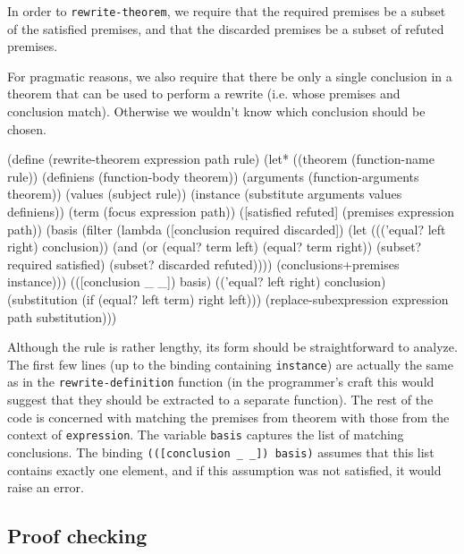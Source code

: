 In order to \texttt{rewrite-theorem}, we require that the required
premises be a subset of the satisfied premises, and that the discarded
premises be a subset of refuted premises.

For pragmatic reasons, we also require that there be only a single
conclusion in a theorem that can be used to perform a rewrite (i.e.
whose premises and conclusion match). Otherwise we wouldn't know
which conclusion should be chosen.

\begin{Snippet}
  (define (rewrite-theorem expression path rule)
    (let* ((theorem (function-name rule))
           (definiens (function-body theorem))
           (arguments (function-arguments theorem))
           (values (subject rule))
           (instance (substitute arguments values definiens))
           (term (focus expression path))
           ([satisfied refuted] (premises expression path))
           (basis (filter
                    (lambda ([conclusion required discarded])
                      (let ((('equal? left right) conclusion))
                        (and (or (equal? term left)
                                 (equal? term right))
                             (subset? required satisfied)
                             (subset? discarded refuted))))
                    (conclusions+premises instance)))
           (([conclusion _ _]) basis)
           (('equal? left right) conclusion)
           (substitution (if (equal? left term) right left)))
      (replace-subexpression expression path substitution)))
\end{Snippet}

Although the rule is rather lengthy, its form should be straightforward
to analyze. The first few lines (up to the binding containing \texttt{instance})
are actually the same as in the \texttt{rewrite-definition} function
(in the programmer's craft this would suggest that they should be
extracted to a separate function). The rest of the code is concerned
with matching the premises from theorem with those from the context of
\texttt{expression}. The variable \texttt{basis} captures the list
of matching conclusions. The binding \texttt{(([conclusion \_ \_]) basis)}
assumes that this list contains exactly one element, and if this assumption
was not satisfied, it would raise an error.

\subsection{Proof checking}

